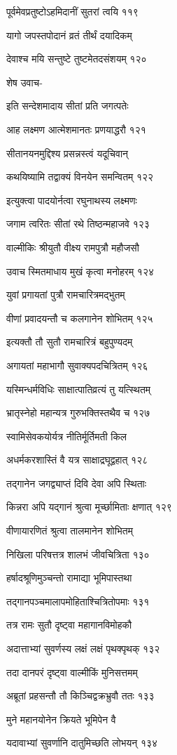 पूर्वमेवप्रतुष्टोऽहमिदानीं सुतरां त्वयि ११९

यागो जपस्तपोदानं व्रतं तीर्थं दयादिकम्

देवाश्च मयि सन्तुष्टे तुष्टमेतदसंशयम् १२०

शेष उवाच-

इति सन्देशमादाय सीतां प्रति जगत्पतेः

आह लक्ष्मण आत्मेशमानतः प्रणयाद्धरौ १२१

सीतानयनमुद्दिश्य प्रसन्नस्त्वं यदूचिवान्

कथयिष्यामि तद्वाक्यं विनयेन समन्वितम् १२२

इत्युक्त्वा पादयोर्नत्वा रघुनाथस्य लक्ष्मणः

जगाम त्वरितः सीतां रथे तिष्ठन्महाजवे १२३

वाल्मीकिः श्रीयुतौ वीक्ष्य रामपुत्रौ महौजसौ

उवाच स्मितमाधाय मुखं कृत्वा मनोहरम् १२४

युवां प्रगायतां पुत्रौ रामचारित्रमद्भुतम्

वीणां प्रवादयन्तौ च कलगानेन शोभितम् १२५

इत्यक्तौ तौ सुतौ रामचारित्रं बहुपुण्यदम्

अगायतां महाभागौ सुवाक्यपदचित्रितम् १२६

यस्मिन्धर्मविधिः साक्षात्पातिव्रत्यं तु यत्स्थितम्

भ्रातृस्नेहो महान्यत्र गुरुभक्तिस्तथैव च १२७

स्वामिसेवकयोर्यत्र नीतिर्मूर्तिमती किल

अधर्मकरशास्तिं वै यत्र साक्षाद्रघूद्वहात् १२८

तद्गानेन जगद्व्याप्तं दिवि देवा अपि स्थिताः

किन्नरा अपि यद्गानं श्रुत्वा मूर्च्छामिताः क्षणात् १२९

वीणायारणितं श्रुत्वा तालमानेन शोभितम्

निखिला परिषत्तत्र शालभं जीवचित्रिता १३०

हर्षादश्रूणिमुञ्चन्तो रामाद्या भूमिपास्तथा

तद्गानपञ्चमालापमोहिताश्चित्रितोपमाः १३१

तत्र रामः सुतौ दृष्ट्वा महागानविमोहकौ

अदात्ताभ्यां सुवर्णस्य लक्षं लक्षं पृथक्पृथक् १३२

तदा दानपरं दृष्ट्वा वाल्मीकिं मुनिसत्तमम्

अब्रूतां प्रहसन्तौ तौ किञ्चिद्वक्रभ्रुवौ ततः १३३

मुने महानयोनेन क्रियते भूमिपेन वै

यदावाभ्यां सुवर्णानि दातुमिच्छति लोभयन् १३४

